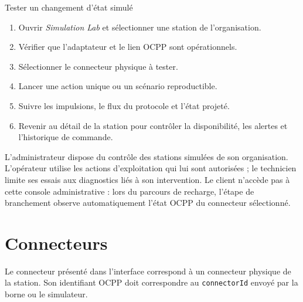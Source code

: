 \begin{procedurebox}{Tester un changement d'état simulé}
  \begin{enumerate}[leftmargin=*]
    \item Ouvrir \emph{Simulation Lab} et sélectionner une station de
    l'organisation.
    \item Vérifier que l'adaptateur et le lien OCPP sont opérationnels.
    \item Sélectionner le connecteur physique à tester.
    \item Lancer une action unique ou un scénario reproductible.
    \item Suivre les impulsions, le flux du protocole et l'état projeté.
    \item Revenir au détail de la station pour contrôler la disponibilité, les
    alertes et l'historique de commande.
  \end{enumerate}
\end{procedurebox}

L'administrateur dispose du contrôle des stations simulées de son
organisation. L'opérateur utilise les actions d'exploitation qui lui sont
autorisées ; le technicien limite ses essais aux diagnostics liés à son
intervention. Le client n'accède pas à cette console administrative : lors du
parcours de recharge, l'étape de branchement observe automatiquement l'état
OCPP du connecteur sélectionné.


\section{Connecteurs}

Le connecteur présenté dans l'interface correspond à un connecteur physique de
la station. Son identifiant OCPP doit correspondre au \texttt{connectorId}
envoyé par la borne ou le simulateur.


